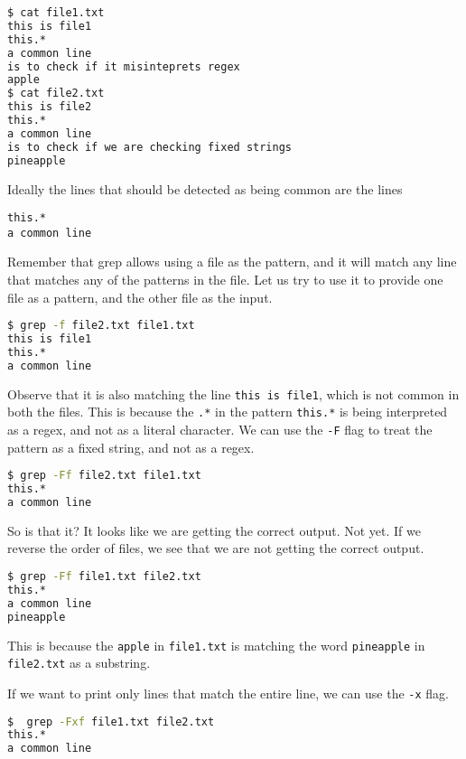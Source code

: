 \begin{lstlisting}[language=bash]
$ cat file1.txt
this is file1
this.*
a common line
is to check if it misinteprets regex
apple
$ cat file2.txt
this is file2
this.*
a common line
is to check if we are checking fixed strings
pineapple
\end{lstlisting}

Ideally the lines that should be detected as being common are the lines

\begin{lstlisting}
this.*
a common line
\end{lstlisting}

Remember that grep allows using a file as the pattern, and it will match any line that matches any of the patterns in the file.
Let us try to use it to provide one file as a pattern, and the other file as the input.

\begin{lstlisting}[language=bash]
$ grep -f file2.txt file1.txt
this is file1
this.*
a common line
\end{lstlisting}

Observe that it is also matching the line \lstinline|this is file1|, which is not common in both the files. This is because the \lstinline|.*| in the pattern \lstinline|this.*| is being interpreted as a regex, and not as a literal character. We can use the \lstinline|-F| flag to treat the pattern as a fixed string, and not as a regex.

\begin{lstlisting}[language=bash]
$ grep -Ff file2.txt file1.txt
this.*
a common line
\end{lstlisting}

So is that it? It looks like we are getting the correct output.
Not yet. If we reverse the order of files, we see that we are not getting the correct output.

\begin{lstlisting}[language=bash]
$ grep -Ff file1.txt file2.txt
this.*
a common line
pineapple
\end{lstlisting}

This is because the \lstinline|apple| in \lstinline|file1.txt| is matching the word \lstinline|pineapple| in \lstinline|file2.txt| as a substring.

If we want to print only lines that match the entire line, we can use the \lstinline|-x| flag.

\begin{lstlisting}[language=bash]
$  grep -Fxf file1.txt file2.txt
this.*
a common line
\end{lstlisting}


